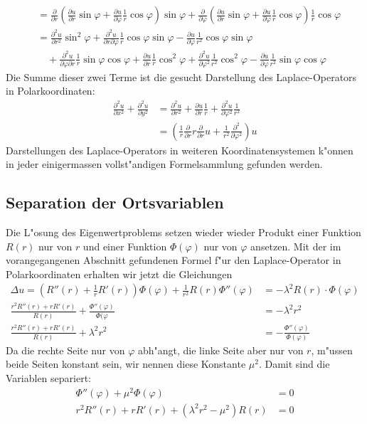 \begin{align*}
&=
\frac{\partial}{\partial r}
\left(
\frac{\partial u}{\partial r}
\sin\varphi
+
\frac{\partial u}{\partial\varphi}
\frac1r\cos\varphi
\right)
\sin\varphi
+
\frac{\partial}{\partial \varphi}
\left(
\frac{\partial u}{\partial r}
\sin\varphi
+
\frac{\partial u}{\partial\varphi}
\frac1r\cos\varphi
\right)
\frac1r\cos\varphi
\\
&=
\frac{\partial^2u}{\partial r^2}\sin^2\varphi
+\frac{\partial^2u}{\partial r\partial\varphi}\frac1r\cos\varphi\sin\varphi
-\frac{\partial u}{\partial\varphi}\frac1{r^2}\cos\varphi\sin\varphi
\\
&\quad
+
\frac{\partial^2u}{\partial\varphi\partial r}\frac1r\sin\varphi\cos\varphi
+\frac{\partial u}{\partial r}\frac1r\cos^2\varphi
+\frac{\partial^2u}{\partial \varphi^2}\frac1{r^2}\cos^2\varphi
-\frac{\partial u}{\partial \varphi}\frac1{r^2}\sin\varphi\cos\varphi
\end{align*}
Die Summe dieser zwei Terme ist die gesucht Darstellung des Laplace-Operators
in Polarkoordinaten:
\begin{align*}
\frac{\partial^2u}{\partial x^2}+\frac{\partial^2u}{\partial y^2}
&=
\frac{\partial^2u}{\partial r^2}
+\frac{\partial u}{\partial r}\frac1r
+\frac{\partial^2u}{\partial\varphi^2}\frac1{r^2}
\\
&=
\left(\frac1r\frac{\partial}{\partial r}r\frac{\partial}{\partial r}u+\frac1{r^2}\frac{\partial^2}{\partial \varphi^2}\right)u
\end{align*}
Darstellungen des Laplace-Operators in weiteren Koordinatensystemen k"onnen
in jeder einigermassen vollst"andigen Formelsammlung gefunden werden.

\subsection{Separation der Ortsvariablen}
Die L"osung des Eigenwertproblems setzen wieder wieder Produkt einer Funktion
$R(r)$
nur von  $r$ und einer Funktion $\Phi(\varphi)$ nur von $\varphi$
ansetzen.
Mit der im vorangegangenen Abschnitt gefundenen Formel f"ur den Laplace-Operator
in Polarkoordinaten erhalten wir jetzt die Gleichungen
\begin{align*}
\Delta u=
\left(R''(r) + \frac1rR'(r)\right)\Phi(\varphi)
+\frac1{r^2}R(r)\Phi''(\varphi)&=-\lambda^2 R(r)\cdot\Phi(\varphi)\\
\frac{r^2R''(r)+rR'(r)}{R(r)}+\frac{\Phi''(\varphi)}{\Phi(\varphi}
&=-\lambda^2 r^2
\\
\frac{r^2R''(r)+rR'(r)}{R(r)}+\lambda^2 r^2&=-\frac{\Phi''(\varphi)}{\Phi(\varphi)}
\end{align*}
Da die rechte Seite nur von $\varphi$ abh"angt, die linke Seite aber nur von $r$,
m"ussen beide Seiten konstant sein, wir nennen diese Konstante $\mu^2$.
Damit sind die Variablen separiert:
\begin{align}
\Phi''(\varphi)+\mu^2\Phi(\varphi)&=0\label{phigleichung}\\
r^2R''(r)+rR'(r)+(\lambda^2 r^2-\mu^2)R(r)&=0\label{rgleichung}
\end{align}

